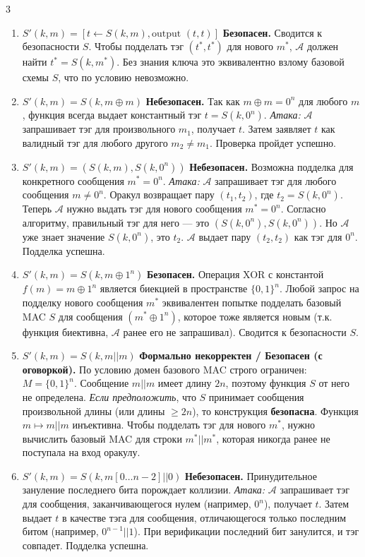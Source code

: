 ﻿\documentclass[9pt,a4paper,landscape]{extarticle}
\begin{document}
\begin{multicols*}{3}
\begin{enumerate}
\def\labelenumi{\arabic{enumi}.}
\item
  \textbf{\(S'(k, m) = [t \leftarrow S(k,m), \text{output } (t, t)]\)} \textbf{Безопасен.} Сводится к безопасности \(S\). Чтобы подделать тэг \((t^*, t^*)\) для нового \(m^*\), \(\mathcal{A}\) должен найти \(t^* = S(k, m^*)\). Без знания ключа это эквивалентно взлому базовой схемы \(S\), что по условию невозможно.
\item
  \textbf{\(S'(k, m) = S(k, m \oplus m)\)} \textbf{Небезопасен.} Так как \(m \oplus m = 0^n\) для любого \(m\), функция всегда выдает константный тэг \(t = S(k, 0^n)\). \emph{Атака:} \(\mathcal{A}\) запрашивает тэг для произвольного \(m_1\), получает \(t\). Затем заявляет \(t\) как валидный тэг для любого другого \(m_2 \neq m_1\). Проверка пройдет успешно.
\item
  \textbf{\(S'(k, m) = (S(k, m), S(k, 0^n))\)} \textbf{Небезопасен.} Возможна подделка для конкретного сообщения \(m^* = 0^n\). \emph{Атака:} \(\mathcal{A}\) запрашивает тэг для любого сообщения \(m \neq 0^n\). Оракул возвращает пару \((t_1, t_2)\), где \(t_2 = S(k, 0^n)\). Теперь \(\mathcal{A}\) нужно выдать тэг для нового сообщения \(m^* = 0^n\). Согласно алгоритму, правильный тэг для него --- это \((S(k, 0^n), S(k, 0^n))\). Но \(\mathcal{A}\) уже знает значение \(S(k, 0^n)\), это \(t_2\). \(\mathcal{A}\) выдает пару \((t_2, t_2)\) как тэг для \(0^n\). Подделка успешна.
\item
  \textbf{\(S'(k, m) = S(k, m \oplus 1^n)\)} \textbf{Безопасен.} Операция XOR с константой \(f(m) = m \oplus 1^n\) является биекцией в пространстве \(\{0,1\}^n\). Любой запрос на подделку нового сообщения \(m^*\) эквивалентен попытке подделать базовый MAC \(S\) для сообщения \((m^* \oplus 1^n)\), которое тоже является новым (т.к. функция биективна, \(\mathcal{A}\) ранее его не запрашивал). Сводится к безопасности \(S\).
\item
  \textbf{\(S'(k, m) = S(k, m || m)\)} \textbf{Формально некорректен / Безопасен (с оговоркой).} По условию домен базового MAC строго ограничен: \(M=\{0,1\}^n\). Сообщение \(m||m\) имеет длину \(2n\), поэтому функция \(S\) от него не определена. \emph{Если предположить}, что \(S\) принимает сообщения произвольной длины (или длины \(\ge 2n\)), то конструкция \textbf{безопасна}. Функция \(m \mapsto m||m\) инъективна. Чтобы подделать тэг для нового \(m^*\), нужно вычислить базовый MAC для строки \(m^* || m^*\), которая никогда ранее не поступала на вход оракулу.
\item
  \textbf{\(S'(k, m) = S(k, m[0\dots n-2] || 0)\)} \textbf{Небезопасен.} Принудительное зануление последнего бита порождает коллизии. \emph{Атака:} \(\mathcal{A}\) запрашивает тэг для сообщения, заканчивающегося нулем (например, \(0^n\)), получает \(t\). Затем выдает \(t\) в качестве тэга для сообщения, отличающегося только последним битом (например, \(0^{n-1}||1\)). При верификации последний бит занулится, и тэг совпадет. Подделка успешна.
\end{enumerate}


\end{multicols*}
\end{document}
